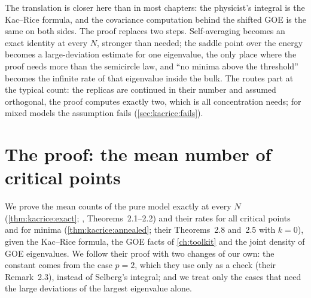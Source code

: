 \begin{refsection}
The translation is closer here than in most chapters: the physicist's integral is the Kac--Rice formula, and the covariance computation behind the shifted GOE is the same on both sides. The proof replaces two steps. Self-averaging becomes an exact identity at every $N$, stronger than needed; the saddle point over the energy becomes a large-deviation estimate for one eigenvalue, the only place where the proof needs more than the semicircle law, and \enquote{no minima above the threshold} becomes the infinite rate of that eigenvalue inside the bulk. The routes part at the typical count: the replicas are continued in their number and assumed orthogonal, the proof computes exactly two, which is all concentration needs; for mixed models the assumption fails (\cref{sec:kacrice:fails}).

\section{The proof: the mean number of critical points}\label{sec:kacrice:proof}

We prove the mean counts of the pure model exactly at every $N$ (\cref{thm:kacrice:exact}; \textcite{AuffingerBenArousCerny2013}, Theorems~2.1--2.2) and their rates for all critical points and for minima (\cref{thm:kacrice:annealed}; their Theorems~2.8 and~2.5 with $k=0$), given the Kac--Rice formula, the GOE facts of \cref{ch:toolkit} and the joint density of GOE eigenvalues. We follow their proof with two changes of our own: the constant comes from the case $p=2$, which they use only as a check (their Remark~2.3), instead of Selberg's integral; and we treat only the cases that need the large deviations of the largest eigenvalue alone.


\end{refsection}

